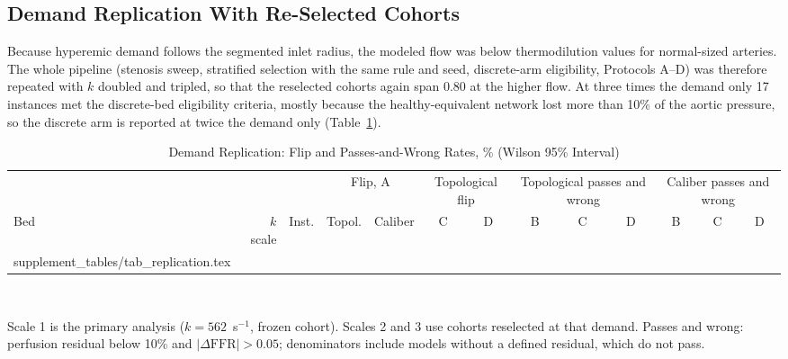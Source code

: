 \documentclass[journal,twoside,web,onecolumn]{ieeecolor}
\begin{document}
\subsection{Demand Replication With Re-Selected Cohorts}\label{sec:replication}
Because hyperemic demand follows the segmented inlet radius, the modeled flow was below thermodilution values for
normal-sized arteries. The whole pipeline (stenosis sweep, stratified selection with the same rule and seed,
discrete-arm eligibility, Protocols A--D) was therefore repeated with $k$ doubled and tripled, so that the reselected
cohorts again span 0.80 at the higher flow. At three times the demand only 17 instances met the discrete-bed
eligibility criteria, mostly because the healthy-equivalent network lost more than 10\% of the aortic pressure, so the
discrete arm is reported at twice the demand only (Table~\ref{tab:repl}).
\begin{table}[!ht]
\caption{Demand Replication: Flip and Passes-and-Wrong Rates, \% (Wilson 95\% Interval)}\label{tab:repl}
\centering\footnotesize\setlength{\tabcolsep}{3pt}
\begin{tabular}{@{}lrrcccccccccc@{}}
\toprule
 & & & \multicolumn{2}{c}{Flip, A} & \multicolumn{2}{c}{Topological flip} & \multicolumn{3}{c}{Topological passes and wrong} & \multicolumn{3}{c}{Caliber passes and wrong}\\
\cmidrule(lr){4-5}\cmidrule(lr){6-7}\cmidrule(lr){8-10}\cmidrule(l){11-13}
Bed & $k$ scale & Inst. & Topol. & Caliber & C & D & B & C & D & B & C & D\\
\midrule
{} supplement_tables/tab_replication.tex 
\bottomrule
\end{tabular}
\\[3pt]
\parbox{0.95\textwidth}{\footnotesize Scale 1 is the primary analysis ($k = 562$~s$^{-1}$, frozen cohort). Scales 2 and 3 use
cohorts reselected at that demand. Passes and wrong: perfusion residual below 10\% and $|\Delta\mathrm{FFR}| > 0.05$;
denominators include models without a defined residual, which do not pass.}
\end{table}

\FloatBarrier
\end{document}
